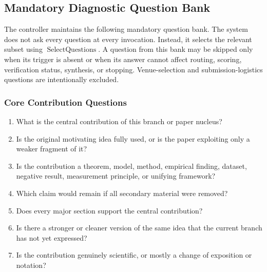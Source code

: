 \documentclass[11pt]{article}
\begin{document}
\subsection{Mandatory Diagnostic Question Bank}

The controller maintains the following mandatory question bank. The system does not ask every question at every invocation. Instead, it selects the relevant subset using $\operatorname{SelectQuestions}$. A question from this bank may be skipped only when its trigger is absent or when its answer cannot affect routing, scoring, verification status, synthesis, or stopping. Venue-selection and submission-logistics questions are intentionally excluded.

\subsubsection*{Core Contribution Questions}
\begin{enumerate}[leftmargin=*]
    \item What is the central contribution of this branch or paper nucleus?
    \item Is the original motivating idea fully used, or is the paper exploiting only a weaker fragment of it?
    \item Is the contribution a theorem, model, method, empirical finding, dataset, negative result, measurement principle, or unifying framework?
    \item Which claim would remain if all secondary material were removed?
    \item Does every major section support the central contribution?
    \item Is there a stronger or cleaner version of the same idea that the current branch has not yet expressed?
    \item Is the contribution genuinely scientific, or mostly a change of exposition or notation?
\end{enumerate}
\end{document}
